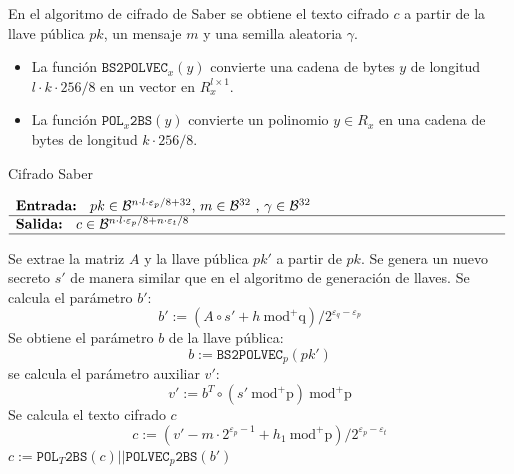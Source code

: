\newpage

En el algoritmo de cifrado de Saber se obtiene el texto cifrado \(c\) a partir de la llave pública \(pk\), un mensaje \(m\) y una semilla aleatoria \(\gamma\).
\begin{itemize}
	\item La función $\texttt{BS2POLVEC}_x(y)$ convierte una cadena de bytes \(y\) de longitud \(l\cdot k \cdot 256/8\) en un vector en \(R_x^{l\times 1}\).
	\item La función $\texttt{POL}_x\texttt{2BS}(y)$ convierte un polinomio \(y\in R_x\) en una cadena de bytes de longitud \(k\cdot 256/8\).
\end{itemize}
\begin{algorithm}[H]
	\small
	\caption{Cifrado Saber}
	$\begin{array}{p{\textwidth}}
		\textbf{Entrada: } \(pk\in \mathcal{B}^{n\cdot l \cdot \varepsilon_p/8+32}\), \(m\in \mathcal{B}^{32}\) , \(\gamma\in \mathcal{B}^{32}\)\\ 
		\hline
		\textbf{Salida: } \(c\in \mathcal{B}^{n\cdot l\cdot \varepsilon_p/8+n\cdot \varepsilon_t/8}\)\\ 
		\hline
	\end{array}$
	\begin{algorithmic}[1]
		\State Se extrae la matriz \(A\) y la llave pública \(pk'\) a partir de \(pk\).
		\State Se genera un nuevo secreto \(s'\) de manera similar que en el algoritmo de generación de llaves.
		\State Se calcula el parámetro \(b'\):
		\begin{equation}
			b':=\left(A\circ s' + h  \ \text{mod}^{+}\text{q}\right) / 2^{\varepsilon_q-\varepsilon_p} 
		\end{equation}
		\State Se obtiene el parámetro \(b\) de la llave pública:
		\begin{equation}
			b:=\texttt{BS2POLVEC}_p(pk')
		\end{equation}
		\State se calcula el parámetro auxiliar \(v'\):
		\begin{equation}
			v':= b^T \circ (s' \ \text{mod}^{+}\text{p}) \ \text{mod}^{+}\text{p}
		\end{equation}
		\State Se calcula el texto cifrado \(c\)
		\begin{equation}
			c:=(v'-m\cdot 2^{\varepsilon_p-1}+h_1 \ \text{mod}^{+}\text{p} )/2^{\varepsilon_p-\varepsilon_t}
		\end{equation}
		\State \Return \(c:=\texttt{POL}_T\texttt{2BS}(c)||\texttt{POLVEC}_p\texttt{2BS}(b')\)
	\end{algorithmic}
\end{algorithm}
 

